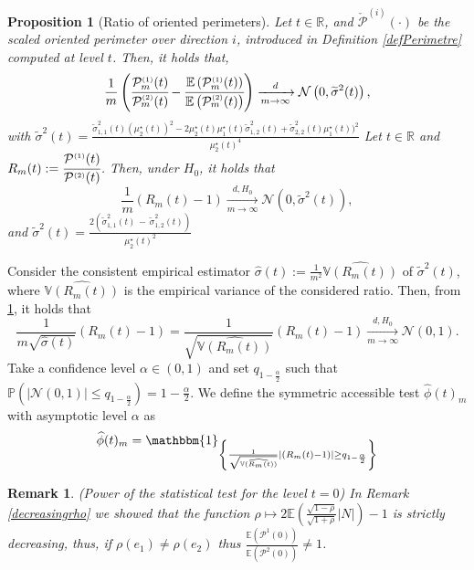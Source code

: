 \documentclass[12pt]{article}
\renewcommand{\tilde}{\widetilde}
\renewcommand{\hat}{\widehat}
\theoremstyle{Theorem}
\newtheorem{Proposition}[Theorem]{Proposition}
\newtheorem{remark}{Remark}
\begin{document}
{\begin{Proposition}[Ratio of oriented perimeters]\label{deltamethodgeneralprop} 
Let  $t \in \mathbb{R}$, and $\check{\mathcal{P}}^{\scriptscriptstyle  (i) }(\cdot)$ be the scaled oriented perimeter over direction $i$, introduced in Definition \ref{defPerimetre} computed at level $t$. Then, it holds that,
\begin{equation*}
\frac{1}{m}\left(\cfrac{\mathcal{P}^{\scriptscriptstyle  (1) }_{m}(t)}{\mathcal{P}^{\scriptscriptstyle  (2)}_{m}(t)} - \cfrac{\mathbb{E}\left(\mathcal{P}^{\scriptscriptstyle  (1) }_{m}(t)\right)}{\mathbb{E}\left(\mathcal{P}^{\scriptscriptstyle  (2)}_{m}(t)\right)} \right)  \xrightarrow[m \to \infty]{d} \mathcal{N}\left(0,  \tilde{\sigma}^{2}(t) \right),
\end{equation*}
with $\tilde{\sigma}^{2}(t) = \frac{\tilde{\sigma}_{\scriptscriptstyle 1,1}^{2}(t)(\mu^{\star}_{2}(t))^{2} - 2\mu^{\star}_{2}(t)\mu^{\star}_{1}(t)\tilde{\sigma}_{\scriptscriptstyle 1,2}^{2}(t) +\tilde{\sigma}_{\scriptscriptstyle 2,2}^{2}(t)\mu^{\star}_{1}(t))^{2}}{\mu^{\star}_{2}(t)^4}$
Let $t \in \mathbb{R}$  and  $R_{m}(t) := \cfrac{\mathcal{P}^{\scriptscriptstyle  (1) }(t)}{\mathcal{P}^{\scriptscriptstyle  (2) }(t)}$. Then, under $H_{0}$, it holds that
\begin{equation}\label{ratiounderH0}
\frac{1}{m}\left(R_{m}(t) - 1 \right)  \xrightarrow[m \to \infty]{d, H_0} \mathcal{N}\left(0,  \tilde{\sigma}^{2}(t)  \right),
\end{equation}
and $\tilde{\sigma}^{2}(t) = \frac{2\left(\tilde{\sigma}_{\scriptscriptstyle 1,1}^{2}(t) \, - \, \tilde{\sigma}_{\scriptscriptstyle 1,2}^{2}(t)\right)}{\mu^{\star}_{2}(t)^2}$
\end{Proposition}
Consider the consistent empirical estimator $\hat{\sigma}(t):= \frac{1}{m^2}\hat{\mathbb{V}\left(R_{m}(t)\right)}$ of $\tilde{\sigma}^{2}(t)$, where $\hat{\mathbb{V}\left(R_{m}(t)\right)}$ is the empirical variance of the considered ratio. Then, from \ref{deltamethodgeneralprop}, it holds that 
$$ \frac{1}{m\sqrt{\hat{\sigma}(t)}}\left(R_{m}(t) - 1 \right) = \frac{1}{\sqrt{\hat{\mathbb{V}\left(R_{m}(t)\right)}}}\left(R_{m}(t) - 1 \right)   \xrightarrow[m \to \infty]{d, H_{0}} \mathcal{N}\left(0, 1 \right).$$
Take a confidence level $\alpha \in (0,1)$ and set $q_{1-\frac{\alpha}{2}}$ such that $\mathbb{P}\left(|\mathcal{N}\left(0,1\right)| \leq  q_{1-\frac{\alpha}{2}} \right) = 1 - \frac{\alpha}{2}$. We define the symmetric accessible test $\hat{\phi}(t)_{m}$ with asymptotic level $\alpha$ as 
\begin{equation}
\label{phihat}
\hat{\phi}(t)_{m}= \mathbbm{1}_{\left\{ \frac{1}{\sqrt{\hat{\mathbb{V}\left(R_{m}(t)\right)}}}\left|\left(R_{m}(t) - 1 \right)\right| \geq q_{1- \frac{\alpha}{2}} \right\}}
\end{equation}
\begin{remark}(Power of the statistical test for the level $t = 0$) In Remark \ref{decreasingrho} we showed that the function $\rho \mapsto 2\mathbb{E}\left(\frac{\sqrt{1-\rho}}{\sqrt{1+\rho}}|N|\right) - 1 $ is strictly decreasing, thus, if $\rho(e_1) \neq \rho(e_2)$ thus $\frac{\mathbb{E}\left(\mathcal{P}^{1}(0)\right)}{\mathbb{E}\left(\mathcal{P}^{2}(0)\right)} \neq 1$. 
\end{remark}
}
\end{document}
